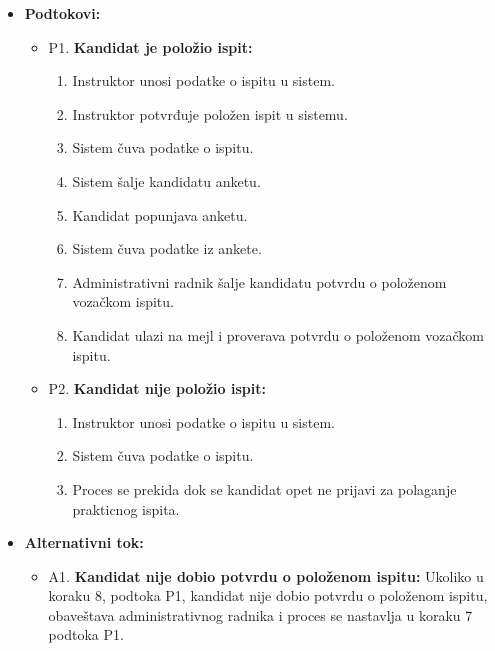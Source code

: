 \begin{itemize}
\begin{enumerate}
   \end{enumerate}

\item \textbf{Podtokovi:}   
 \begin{itemize}
   \item P1. \textbf{Kandidat je položio ispit:}
   \begin{enumerate}
       \item Instruktor unosi podatke o ispitu u sistem.
       \item Instruktor potvrđuje položen ispit u sistemu.
       \item Sistem čuva podatke o ispitu.
       \item Sistem šalje kandidatu anketu.
       \item Kandidat popunjava anketu.
       \item Sistem čuva podatke iz ankete.
       \item Administrativni radnik šalje kandidatu potvrdu o položenom vozačkom ispitu.
       \item Kandidat ulazi na mejl i proverava potvrdu o položenom vozačkom ispitu.
   \end{enumerate}
   \item P2. \textbf{Kandidat nije položio ispit:}
   \begin{enumerate}
       \item Instruktor unosi podatke o ispitu u sistem.
       \item Sistem čuva podatke o ispitu.
       \item Proces se prekida dok se kandidat opet ne prijavi za polaganje prakticnog ispita.
   \end{enumerate}
  
   \end{itemize}

\item \textbf{Alternativni tok:}  
   \begin{itemize} 
     \item A1. \textbf{Kandidat nije dobio potvrdu o položenom ispitu:}
     Ukoliko u koraku 8, podtoka P1, kandidat nije dobio potvrdu o položenom ispitu, obaveštava administrativnog radnika i proces se nastavlja u koraku 7 podtoka P1.
   \end{itemize}

\end{itemize}  

